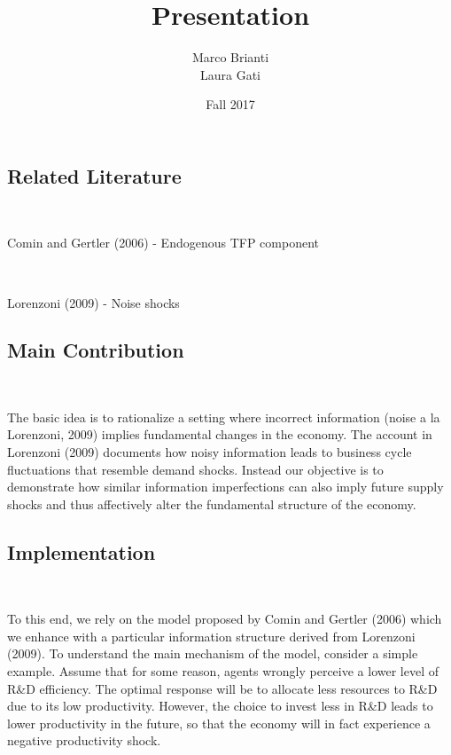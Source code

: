 \documentclass{article}
\title{Presentation}
\author{Marco Brianti\\Laura Gati}
\date{Fall 2017}
\begin{document}
\maketitle

\subsection*{Related Literature}

\

Comin and Gertler (2006) - Endogenous TFP component

\

Lorenzoni (2009) - Noise shocks

\subsection*{Main Contribution}

\

The basic idea is to rationalize a setting where incorrect information (noise a la Lorenzoni, 2009) implies fundamental changes in the economy. The account in Lorenzoni (2009) documents how noisy information leads to business cycle fluctuations that resemble demand shocks. Instead our objective is to demonstrate how similar information imperfections can also imply future supply shocks and thus affectively alter the fundamental structure of the economy.

\subsection*{Implementation}

\

To this end, we rely on the model proposed by Comin and Gertler (2006) which we enhance with a particular information structure derived from Lorenzoni (2009). To understand the main mechanism of the model, consider a simple example. Assume that for some reason, agents wrongly perceive a lower level of R\&D efficiency. The optimal response will be to allocate less resources to R\&D due to its low productivity. However, the choice to invest less in R\&D leads to lower productivity in the future, so that the economy will in fact experience a negative productivity shock.
\end{document}
